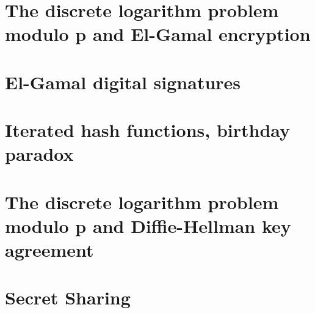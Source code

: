 \documentclass{article}
\begin{document}
\section{The discrete logarithm problem modulo p and El-Gamal encryption}

\clearpage

\section{El-Gamal digital signatures}

\clearpage

\section{Iterated hash functions, birthday paradox}

\clearpage

\section{The discrete logarithm problem modulo p and Diffie-Hellman key agreement}

\clearpage

\section{Secret Sharing}

\end{document}
